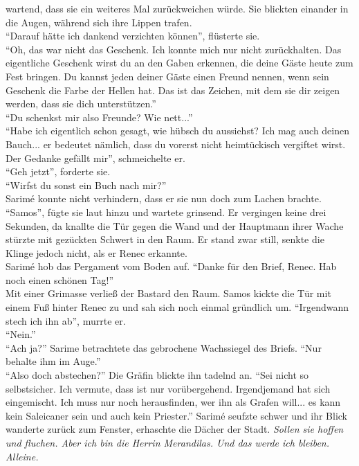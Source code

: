 wartend, dass sie ein weiteres Mal zurückweichen würde. Sie blickten einander in die Augen, während 
sich ihre Lippen trafen.\\
``Darauf hätte ich dankend verzichten können'', flüsterte sie.\\
``Oh, das war nicht das Geschenk. Ich konnte mich nur nicht zurückhalten. Das eigentliche Geschenk 
wirst du an den Gaben erkennen, die deine Gäste heute zum Fest bringen. Du kannst jeden deiner Gäste 
einen Freund nennen, wenn sein Geschenk die Farbe der Hellen hat. Das ist das Zeichen, mit dem sie 
dir zeigen werden, dass sie dich unterstützen.''\\
``Du schenkst mir also Freunde? Wie nett...''\\
``Habe ich eigentlich schon gesagt, wie hübsch du aussiehst? Ich mag auch deinen Bauch... er 
bedeutet nämlich, dass du vorerst nicht heimtückisch vergiftet wirst. Der Gedanke gefällt mir'', 
schmeichelte er.\\
``Geh jetzt'', forderte sie.\\
``Wirfst du sonst ein Buch nach mir?''\\
Sarimé konnte nicht verhindern, dass er sie nun doch zum Lachen brachte. ``Samos'', fügte sie laut 
hinzu und wartete grinsend. Er vergingen keine drei Sekunden, da knallte die Tür gegen die Wand und 
der Hauptmann ihrer Wache stürzte mit gezückten Schwert in den Raum. Er stand zwar still, senkte die 
Klinge jedoch nicht, als er Renec erkannte.\\
Sarimé hob das Pergament vom Boden auf. ``Danke für den Brief, Renec. Hab noch einen schönen 
Tag!''\\
Mit einer Grimasse verließ der Bastard den Raum. Samos kickte die Tür mit einem Fuß hinter Renec zu 
und sah sich noch einmal gründlich um. 
``Irgendwann stech ich ihn ab'', murrte er.\\
``Nein.''\\
``Ach ja?''
Sarime betrachtete das gebrochene Wachssiegel des Briefs. ``Nur behalte ihm im Auge.''\\
``Also doch abstechen?''
Die Gräfin blickte ihn tadelnd an. ``Sei nicht so selbstsicher. Ich vermute, dass ist nur 
vorübergehend. Irgendjemand hat sich eingemischt.  Ich muss nur noch herausfinden, wer ihn als 
Grafen will... es kann kein Saleicaner sein und auch kein Priester.'' Sarimé seufzte schwer und ihr 
Blick wanderte zurück zum Fenster, erhaschte die Dächer der Stadt. \textit{Sollen sie hoffen und 
fluchen. Aber ich bin die Herrin Merandilas. Und das werde ich bleiben. Alleine.}

